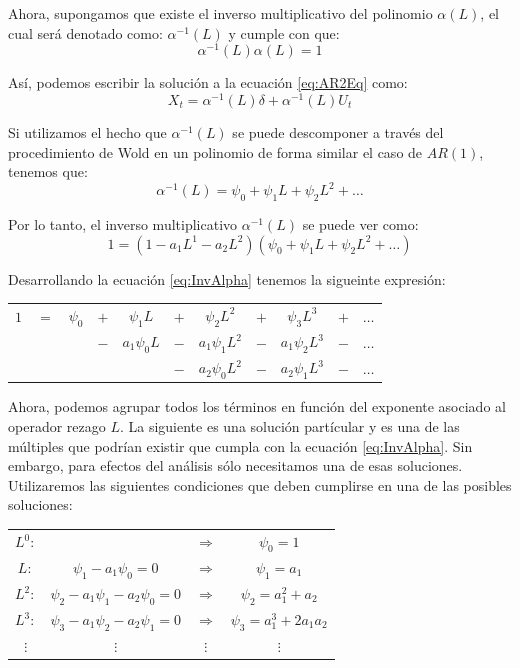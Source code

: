 \documentclass[
]{book}
\begin{document}
Ahora, supongamos que existe el inverso multiplicativo del polinomio \(\alpha(L)\), el cual será denotado como: \(\alpha^{-1}(L)\) y cumple con que:
\begin{equation}
    \alpha^{-1}(L) \alpha(L) = 1    
\end{equation}

Así, podemos escribir la solución a la ecuación \eqref{eq:AR2Eq} como:
\begin{equation*}
    X_t = \alpha^{-1}(L) \delta + \alpha^{-1}(L) U_t
\end{equation*}

Si utilizamos el hecho que \(\alpha^{-1}(L)\) se puede descomponer a través del procedimiento de Wold en un polinomio de forma similar el caso de \(AR(1)\), tenemos que:
\begin{equation}
    \alpha^{-1}(L) = \psi_0 + \psi_1 L + \psi_2 L^2 + \ldots
\end{equation}

Por lo tanto, el inverso multiplicativo \(\alpha^{-1}(L)\) se puede ver como:
\begin{equation}
    1 = (1 - a_1 L^1 - a_2 L^2) (\psi_0 + \psi_1 L + \psi_2 L^2 + \ldots)
    \label{eq:InvAlpha}
\end{equation}

Desarrollando la ecuación \eqref{eq:InvAlpha} tenemos la sigueinte expresión:

\begin{center}
\begin{tabular}{ c c c c c c c c c c c } 
    $1$ & $=$ & $\psi_0$ & $+$ & $\psi_1 L$ & $+$ & $\psi_2 L^2$ & $+$ & $\psi_3 L^3$ & $+$ & $\ldots$ \\
    $ $ & $ $ & $ $ & $-$ & $a_1 \psi_0 L$ & $-$ & $a_1 \psi_1 L^2$ & $-$ & $a_1 \psi_2 L^3$ & $-$ & $\ldots$ \\
    $ $ & $ $ & $ $ & $ $ & $ $ & $-$ & $a_2 \psi_0 L^2 $ & $-$ & $a_2 \psi_1 L^3$ & $-$ & $\ldots$
\end{tabular}
\end{center}

Ahora, podemos agrupar todos los términos en función del exponente asociado al operador rezago \(L\). La siguiente es una solución partícular y es una de las múltiples que podrían existir que cumpla con la ecuación \eqref{eq:InvAlpha}. Sin embargo, para efectos del análisis sólo necesitamos una de esas soluciones. Utilizaremos las siguientes condiciones que deben cumplirse en una de las posibles soluciones:

\begin{center}
\begin{tabular}{ c c c c } 
    $L^0 :$ & $ $ & $\Rightarrow$ & $\psi_0 = 1$ \\
    $L :$ & $\psi_1 - a_1 \psi_0 = 0$ & $\Rightarrow$ & $\psi_1 = a_1$ \\
    $L^2 :$ & $\psi_2 - a_1 \psi_1 - a_2 \psi_0 = 0$ & $\Rightarrow$ & $\psi_2 = a^2_1 + a_2$ \\
    $L^3 :$ & $\psi_3 - a_1 \psi_2 - a_2 \psi_1 = 0$ & $\Rightarrow$ & $\psi_3 = a^3_1 + 2 a_1 a_2$ \\
    $\vdots$ & $\vdots$ & $\vdots$ & $\vdots$
\end{tabular}
\end{center}
\end{document}
